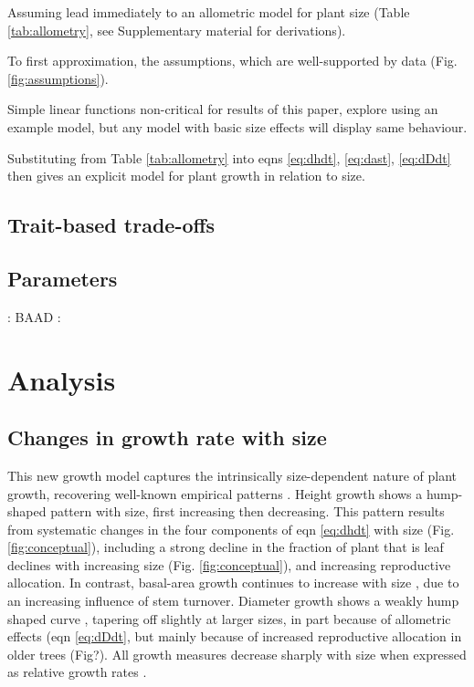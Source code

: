 \documentclass[a4paper,11pt]{article}
\begin{document}
Assuming lead immediately to an allometric model for plant size (Table \ref{tab:allometry}, see Supplementary material for derivations).

To first approximation, the assumptions, which are well-supported by data (Fig. \ref{fig:assumptions}).

Simple linear functions non-critical for results of this paper, explore using an example model, but any model with basic size effects will display same behaviour.

Substituting from Table \ref{tab:allometry} into eqns \ref{eq:dhdt}, \ref{eq:dast}, \ref{eq:dDdt} then gives an explicit model for plant growth in relation to size.

\subsection{Trait-based trade-offs}


\subsection{Parameters}

\citep{Falster-2015b}: BAAD
\citep{Falster-2016}: \plant


\section{Analysis}



\subsection{Changes in growth rate with size}

This new growth model captures the intrinsically size-dependent nature of plant growth, recovering well-known empirical patterns \citep{Sillett-2010, King-2011}. Height growth shows a hump-shaped pattern with size, first increasing then decreasing. This pattern results from systematic changes in the four components of eqn \ref{eq:dhdt} with size (Fig. \ref{fig:conceptual}), including a strong decline in the fraction of plant that is leaf declines with increasing size (Fig. \ref{fig:conceptual}), and increasing reproductive allocation. In contrast, basal-area growth continues to increase with size \citep{Sillett-2010, Stephenson-2014}, due to an increasing influence of stem turnover. Diameter growth shows a weakly hump shaped curve \citep{Herault-2011}, tapering off slightly at larger sizes, in part because of allometric effects (eqn \ref{eq:dDdt}, but mainly because of increased reproductive allocation in older trees (Fig?). All growth measures decrease sharply with size when expressed as relative growth rates \citep{Iida-2014}.
\end{document}
